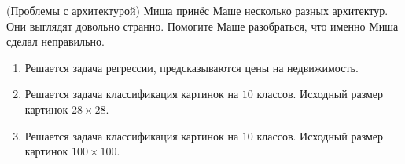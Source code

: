 \begin{problem}{(Проблемы с архитектурой)}
Миша принёс Маше несколько разных архитектур. Они выглядят довольно странно. Помогите Маше разобраться, что именно Миша сделал неправильно. 

\begin{enumerate} 

\item Решается задача регрессии, предсказываются цены на недвижимость. 



\item Решается задача классификация картинок на $10$ классов. Исходный размер картинок $28 \times 28$.



\item Решается задача классификация картинок на $10$ классов. Исходный размер картинок $100 \times 100$.







\end{enumerate} 


\end{problem}










